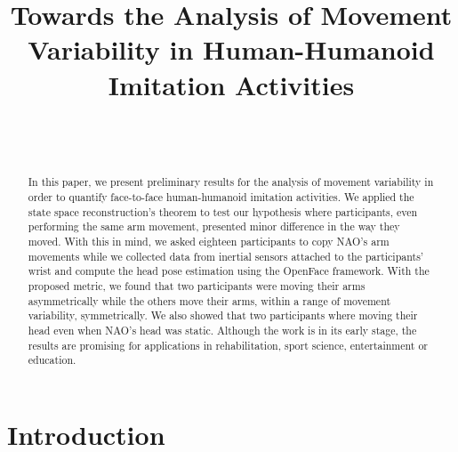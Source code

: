 \documentclass{sigchi}
\def\plaintitle{Towards the Analysis of Movement Variability in Human-Humanoid Imitation Activities}
\def\plainkeywords{Authors' choice; of terms; separated; by
  semicolons; include commas, within terms only; required.}
\begin{document}
\title{\plaintitle}

\author{%
  \\
  \\
}

\maketitle

\begin{abstract}
  In this paper, we present preliminary results for the analysis of movement
  variability in order to quantify face-to-face human-humanoid imitation activities.
  We applied the state space reconstruction's theorem to test our
  hypothesis where participants, even performing the same arm movement,
  presented minor difference in the way they moved.
  With this in mind, we asked eighteen participants to copy NAO's arm
  movements while we collected data from inertial sensors attached to the participants' wrist
  and compute the head pose estimation using the OpenFace framework.
  With the proposed metric, we found that two participants were moving their arms
  asymmetrically while the others move their arms, within a range of movement
  variability, symmetrically. We also showed that two participants where moving
  their head even when NAO's head was static.
  Although the work is in its early stage, the results are promising for
  applications in rehabilitation, sport science, entertainment or education.
\end{abstract}




\section{Introduction}
\end{document}
